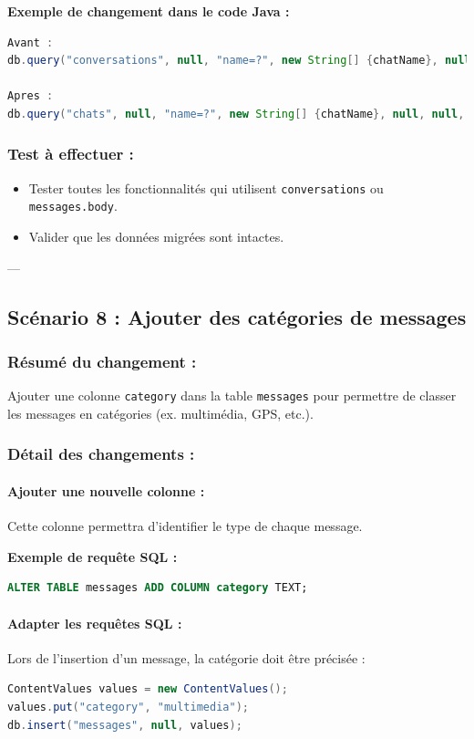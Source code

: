\documentclass[a4paper,11pt]{article}
\begin{document}
\textbf{Exemple de changement dans le code Java :}
\begin{lstlisting}[language=Java]
Avant :
db.query("conversations", null, "name=?", new String[] {chatName}, null, null, null);

Apres :
db.query("chats", null, "name=?", new String[] {chatName}, null, null, null);
\end{lstlisting}

\subsubsection*{Test à effectuer :}
\begin{itemize}
    \item Tester toutes les fonctionnalités qui utilisent \texttt{conversations} ou \texttt{messages.body}.
    \item Valider que les données migrées sont intactes.
\end{itemize}

---

\subsection*{Scénario 8 : Ajouter des catégories de messages}

\subsubsection*{Résumé du changement :}
Ajouter une colonne \texttt{category} dans la table \texttt{messages} pour permettre de classer les messages en catégories (ex. multimédia, GPS, etc.).

\subsubsection*{Détail des changements :}

\paragraph{Ajouter une nouvelle colonne :}
Cette colonne permettra d'identifier le type de chaque message.

\textbf{Exemple de requête SQL :}
\begin{lstlisting}[language=SQL]
ALTER TABLE messages ADD COLUMN category TEXT;
\end{lstlisting}

\paragraph{Adapter les requêtes SQL :}
Lors de l'insertion d'un message, la catégorie doit être précisée :
\begin{lstlisting}[language=Java]
ContentValues values = new ContentValues();
values.put("category", "multimedia");
db.insert("messages", null, values);
\end{lstlisting}
\end{document}
